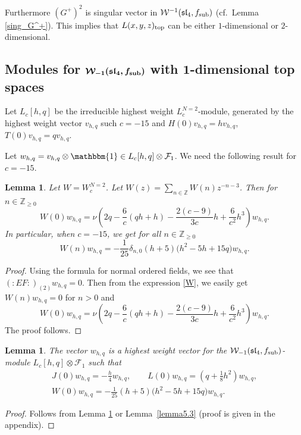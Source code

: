 \documentclass[pdftex]{sigma}
\numberwithin{equation}{section}
\newcommand{\Z}{\mathbb Z}
\newcommand{\F}{\mathcal F}
\newtheorem{Lemma}[Theorem]{Lemma}
\begin{document}
 Furthermore $(G^+)^2$ is singular vector in $\mathcal{W}^{-1}(\mathfrak{sl}_4, f_{\rm sub})$ (cf.\ Lemma \ref{sing_G^+}). This implies that $ L(x,y,z)_{\text{\rm top}}$ can be either $1$-dimensional or $2$-dimensional.

 \subsection[Modules for W\_-1(sl\_4, f\_sub) with 1-dimensional top spaces]{Modules for $\boldsymbol{\mathcal{W}_{-1}(\mathfrak{sl}_4, f_{\rm sub})}$ with $\boldsymbol{1}$-dimensional top spaces}


 Let $L_c[h,q]$ be the irreducible highest weight $L_c ^{N=2}$-module, generated by the highest weight vector $v_{h,q}$ such $c=-15$ and
 $H(0) v_{h,q} = h v_{h,q}$, $ T(0) v_{h,q} = q v_{h,q}$.

 Let $w_{h,q} = v_{h,q} \otimes \mathbbm{1} \in L_c[h,q] \otimes \F_1$. We need the following result for $c=-15$.

 \begin{Lemma} \label{W(n)w}
 Let $W= W^{N=2}_{c}$. Let $W(z) = \sum_{n\in {\Z}} W(n) z^{-n-3}$.
 Then for $n \in {\Z}_{\ge 0}$
 \[
 W(0) w_{h,q} = \nu \left( 2 q -\frac{6}{c} ( q h + h) - \frac{2 (c-9)}{3c} h + \frac{6}{c^2}h^3 \right)w_{h, q}.
 \]
 In particular, when $c=-15$, we get for all $n \in {\Z}_{\ge 0}$
 \[
 W(n ) w_{h,q} = -\frac{1}{25} \delta_{n,0} ( h+5) \bigl(h^2 - 5h + 15 q\bigr) w_{h,q} .
 \]
 \end{Lemma}
 \begin{proof}
Using the formula for normal ordered fields, we see that $({:} E F{:}) _{(2)}w_{h,q} =0 $.
Then from the expression \eqref{W}, we easily get $W(n) w_{h,q} =0$ for $n >0$ and
\[
 W(0) w_{h,q} = \nu \left( 2 q -\frac{6}{c} ( q h + h) - \frac{2 (c-9)}{3c} h + \frac{6}{c^2}h^3 \right)w_{h, q}.
 \]
The proof follows.
 \end{proof}



\begin{Lemma} \label{hw_Wk}
The vector $w_{h,q}$ is a highest weight vector for the $\mathcal{W}_{-1}(\mathfrak{sl}_4, f_{\rm sub})$-module $L_c[h,q]\otimes \F_1$ such that
\begin{gather*}
 J(0) w_{h,q} = -\frac{h}{4} w_{h,q}, \qquad
 L(0) w_{h,q} = \left(q+\frac{1}{8}h^2\right) w_{h,q}, \\
 W(0) w_{h,q} = -\frac{1}{25} (h+5) \bigl(h^2-5 h+15 q\bigr) w_{h,q}.
 \end{gather*}
 \end{Lemma}
\begin{proof}
Follows from Lemma \ref{W(n)w} or Lemma~\ref{lemma5.3} (proof is given in the appendix).
\end{proof}
	
\end{document}
